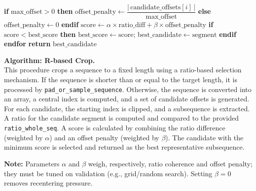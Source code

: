 \documentclass{article}
\theoremstyle{remark}
\begin{document}
\begin{algorithm}[H]
\begin{algorithmic}[1]
        \State \quad \textbf{if} $\mathrm{max\_offset} > 0$ \textbf{then}
            \State \qquad $\mathrm{offset\_penalty} \gets \dfrac{\bigl|\,\mathrm{candidate\_offsets}[i]\,\bigr|}{\mathrm{max\_offset}}$
        \State \quad \textbf{else}
            \State \qquad $\mathrm{offset\_penalty} \gets 0$
        \State \quad \textbf{endif}
        \State \quad $\mathrm{score} \gets \alpha \times \mathrm{ratio\_diff} + \beta \times \mathrm{offset\_penalty}$
        \State \quad \textbf{if} $\mathrm{score} < \mathrm{best\_score}$ \textbf{then}
            \State \qquad $\mathrm{best\_score} \gets \mathrm{score}$; \quad $\mathrm{best\_candidate} \gets \mathrm{segment}$
        \State \quad \textbf{endif}
    \State \textbf{endfor}
    \State \textbf{return} $\mathrm{best\_candidate}$
\EndProcedure
\end{algorithmic}
\end{algorithm}

\noindent
\textbf{Algorithm: R-based Crop.}\\
This procedure crops a sequence to a fixed length using a ratio-based selection mechanism. If the sequence is shorter than or equal to the target length, it is processed by \texttt{pad\_or\_sample\_sequence}. Otherwise, the sequence is converted into an array, a central index is computed, and a set of candidate offsets is generated. For each candidate, the starting index is clipped, and a subsequence is extracted. A ratio for the candidate segment is computed and compared to the provided \texttt{ratio\_whole\_seq}. A score is calculated by combining the ratio difference (weighted by $\alpha$) and an offset penalty (weighted by $\beta$). The candidate with the minimum score is selected and returned as the best representative subsequence.

\textbf{Note:}
Parameters $\alpha$ and $\beta$ weigh, respectively, ratio coherence and offset penalty; they must be tuned on validation (e.g., grid/random search). Setting $\beta=0$ removes recentering pressure.
\end{document}
